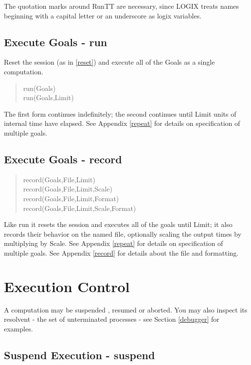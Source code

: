 \noindent
The quotation marks around RunTT are necessary, since LOGIX
treats names beginning with a capital letter or an underscore as logix
variables.

\subsection{Execute Goals - run}
\label{runners}

Reset the session (as in \ref{reset}) and
execute all of the Goals as a single computation.

\begin{verse}
    run(Goals) \\
    run(Goals,Limit)
\end{verse}

\noindent
The first form continues
indefinitely; the second continues until Limit units of internal time have 
elapsed.  See  Appendix \ref{repeat} for details on specification 
of multiple goals.

\subsection{Execute Goals - record}
\label{recorders}
\begin{verse}
    record(Goals,File,Limit) \\
    record(Goals,File,Limit,Scale) \\
    record(Goals,File,Limit,Format) \\
    record(Goals,File,Limit,Scale,Format)
\end{verse}

\noindent
Like run it resets the session and
executes all of the goals until Limit; it also records their behavior
on the named file, optionally scaling the output times by multiplying
by Scale.  See  Appendix \ref{repeat} for
details on specification of multiple goals.  See  Appendix 
\ref{record} for details about the file and formatting.

\section{Execution Control}
\noindent
A computation may be  suspended ,  resumed  or  aborted.  You may also
inspect its resolvent - the set of unterminated processes  - see
Section \ref{debugger} for examples.

\subsection{Suspend Execution - suspend}
\label{suspend}


